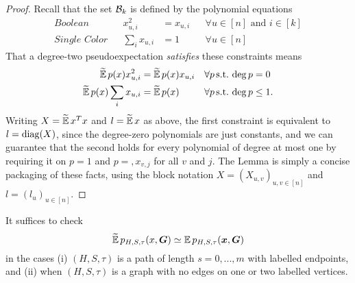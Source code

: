 \begin{proof}
    Recall that the set $\mathcal{B}_k$ is defined by the polynomial equations
    \begin{align*}
    	\textit{Boolean} & & x_{u,i}^2 &= x_{u,i} & &\forall u\in[n] \text{ and } i\in [k] \\
    	\textit{Single Color} & & \sum_i x_{u,i} &= 1 & &\forall u\in[n] 
    \end{align*}
    That a degree-two pseudoexpectation \textit{satisfies} these constraints means 
    \begin{align*}
        \widetilde{\operatorname*{\mathbb{E}}}\, p(x)x_{u,i}^2 &= \widetilde{\operatorname*{\mathbb{E}}}\, p(x) x_{u,i} & &\forall p \,\text{s.t.}\,\deg p = 0 \\
        \widetilde{\operatorname*{\mathbb{E}}}\, p(x)\sum_i x_{u,i} &= \widetilde{\operatorname*{\mathbb{E}}}\, p(x) & &\forall p \,\text{s.t.}\,\deg p \le 1. 
    \end{align*}
   Writing $X = \widetilde{\operatorname*{\mathbb{E}}}\, x^T x$ and $l = \widetilde{\operatorname*{\mathbb{E}}}\, x$ as above, the first constraint is equivalent to $l = \operatorname{diag}(X)$, since the degree-zero polynomials are just constants, and we can guarantee that the second holds for every polynomial of degree at most one by requiring it on $p = 1$ and $p= ,x_{v,j}$ for all $v$ and $j$. The Lemma is simply a concise packaging of these facts, using the block notation $X = (X_{u,v})_{u,v\in[n]}$ and $l = (l_u)_{u\in [n]}$.
\end{proof}

\begin{proposition}
    It suffices to check
    $$
        \widetilde{\operatorname*{\mathbb{E}}}\, p_{H,S,\tau}(x,\boldsymbol{G}) \simeq \operatorname*{\mathbb{E}} p_{H,S,\tau}({\boldsymbol{x}},\boldsymbol{G})
    $$
    in the cases (i) $(H,S,\tau)$ is a path of length $s=0,...,m$ with labelled endpoints, and (ii) when $(H,S, \tau)$ is a graph with no edges on one or two labelled vertices.
\end{proposition}

